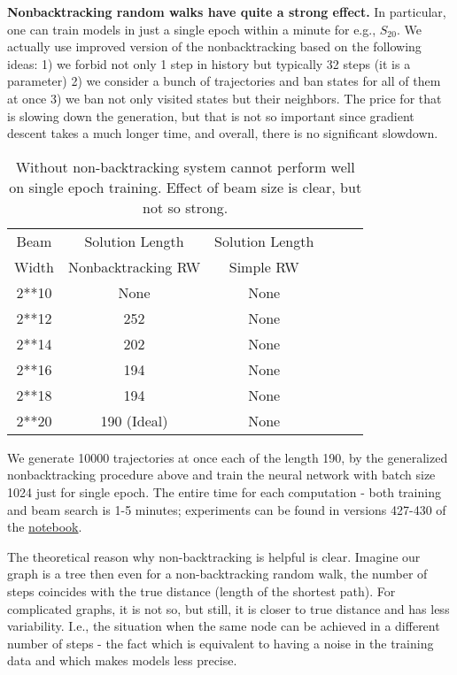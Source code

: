 \documentclass[atmp]{ipart_v1}
\numberwithin{equation}{section}
\theoremstyle{plain}%
\begin{document}
{\bf Nonbacktracking random walks have quite a strong effect.} In particular, one can train models in just a single epoch within a minute for e.g., $S_{20}$. We actually use improved version of the nonbacktracking based on the following ideas: 1) we forbid not only 1 step in history but typically 32 steps (it is a parameter) 2) we consider a bunch of trajectories and ban states for all of them at once 3) we ban not only visited states but their neighbors. The price for that is slowing down the generation, but that is not so important since gradient descent takes a much longer time, and overall, there is no significant slowdown. 

\begin{table}[h]
  \centering
  \begin{tabular}{|c|c|c|c|c|c|}
  \hline
  Beam &  Solution Length &  Solution Length  \\
 Width &  Nonbacktracking RW  & Simple RW  \\
  \hline
  2**10  & None & None \\
  \hline
  2**12  & 252 & None \\
  \hline  
  2**14  & 202 & None \\
  \hline  
  2**16  & 194 & None \\
  \hline 
  2**18  & 194 & None \\
  \hline  
  2**20  & 190 (Ideal) & None \\
  \hline  
  \end{tabular}
  \captionsetup{skip=10pt} 
  \caption{Without non-backtracking system cannot perform well on single epoch training. Effect of beam size is clear, but not so strong. }
  \label{tab:example_nn}
\end{table}


We generate 10000 trajectories at once each of the length 190, by the generalized nonbacktracking procedure above and train the neural network with batch size 1024 just for single epoch.
The entire time for each computation - both training and beam search is 1-5 minutes; experiments can be found in versions 427-430 of the \href{https://www.kaggle.com/code/alexandervc/lrx-cayleypy-rl-mdqn?scriptVersionId=224294767}{notebook}.

The theoretical reason why non-backtracking is helpful is clear. Imagine our graph is a tree then even for a non-backtracking  random walk, the number of steps coincides with the true distance (length of the shortest path). For complicated graphs, it is not so, but still, it is closer to true distance and has less variability. I.e., the situation when the same node can be achieved in a different number of steps - the fact which is equivalent to having a noise in the training data and which makes models less precise. 
\end{document}
